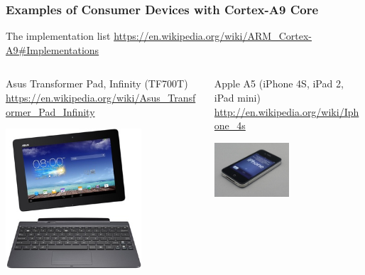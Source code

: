 \documentclass{beamer}
\begin{document}
\begin{frame}
\frametitle{Examples of Consumer Devices with Cortex-A9 Core}

{ \scriptsize
The implementation list \url{https://en.wikipedia.org/wiki/ARM\_Cortex-A9\#Implementations}
}
\vspace{2mm}
\begin{columns}
\begin{column}{0.5\textwidth}
  {\scriptsize
  Asus Transformer Pad, Infinity (TF700T) \tiny \linebreak
  \url{https://en.wikipedia.org/wiki/Asus_Transformer_Pad_Infinity}
  }
  \begin{center}
    \includegraphics[width=0.7\textwidth]{fig/asus-transformer.jpg}
  \end{center}
\end{column}
\begin{column}{0.5\textwidth}
  {\scriptsize
  Apple A5 (iPhone 4S, iPad 2, iPad mini) \tiny \linebreak
  \url{http://en.wikipedia.org/wiki/Iphone_4s}
  }
  \begin{center}
    \includegraphics[width=0.5\textwidth]{fig/apple-iphone-with-a5.jpg}

\end{center}
\end{column}
\end{columns}
\end{frame}
\end{document}
